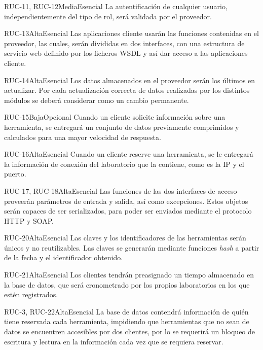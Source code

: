 {RUC-11, RUC-12}{Media}{Esencial}
{
La autentificación de cualquier usuario, independientemente del tipo 
de rol, será validada por el proveedor.
}

{RUC-13}{Alta}{Esencial}
{
Las aplicaciones cliente usarán las funciones contenidas en el 
proveedor, las cuales, serán divididas en dos interfaces, 
con una estructura de servicio web definido por los ficheros WSDL y 
así dar acceso a las aplicaciones cliente.
}

{RUC-14}{Alta}{Esencial}
{
Los datos almacenados en el proveedor serán los últimos en actualizar. Por
cada actualización correcta de datos realizadas por los distintos 
módulos se deberá considerar como un cambio permanente.
}

{RUC-15}{Baja}{Opcional}
{
Cuando un cliente solicite información sobre una herramienta, se 
entregará un conjunto de datos previamente comprimidos y calculados 
para una mayor velocidad de respuesta.
}

{RUC-16}{Alta}{Esencial}
{
Cuando un cliente reserve una herramienta, se le entregará la 
información de conexión del laboratorio que la contiene, como es la 
IP y el puerto.
}

{RUC-17, RUC-18}{Alta}{Esencial}
{
Las funciones de las dos interfaces de acceso proveerán parámetros 
de entrada y salida, así como excepciones. Estos objetos serán 
capaces de ser serializados, para poder ser enviados mediante el 
protocolo HTTP y SOAP.
}

{RUC-20}{Alta}{Esencial}
{
Las claves y los identificadores de las herramientas serán únicos y 
no reutilizables. Las claves se generarán mediante funciones 
\emph{hash} a partir de la fecha y el identificador obtenido. 
}

{RUC-21}{Alta}{Esencial}
{
Los clientes tendrán preasignado un tiempo almacenado en la base 
de datos, que será cronometrado por los propios laboratorios en los que 
estén registrados.
}

{RUC-3, RUC-22}{Alta}{Esencial}
{
La base de datos contendrá información de quién tiene reservada
cada herramienta, impidiendo que herramientas que no sean de datos se 
encuentren accesibles por dos clientes, por lo se requerirá un bloqueo 
de escritura y lectura en la información cada vez que se requiera reservar.
}

